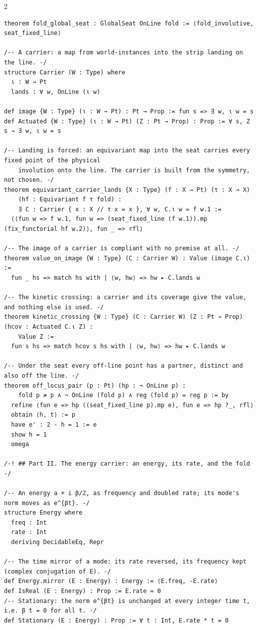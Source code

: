 \documentclass[10pt]{article}
\begin{document}
\begin{multicols}{2}
\begin{Verbatim}[fontsize=\fontsize{6.2}{7.2}\selectfont,breaklines,breakanywhere,breaksymbolleft={}]
theorem fold_global_seat : GlobalSeat OnLine fold := ⟨fold_involutive, seat_fixed_line⟩

/-- A carrier: a map from world-instances into the strip landing on the line. -/
structure Carrier (W : Type) where
  ι : W → Pt
  lands : ∀ w, OnLine (ι w)

def image {W : Type} (ι : W → Pt) : Pt → Prop := fun s => ∃ w, ι w = s
def Actuated {W : Type} (ι : W → Pt) (Z : Pt → Prop) : Prop := ∀ s, Z s → ∃ w, ι w = s

/-- Landing is forced: an equivariant map into the seat carries every fixed point of the physical
    involution onto the line. The carrier is built from the symmetry, not chosen. -/
theorem equivariant_carrier_lands {X : Type} (f : X → Pt) (τ : X → X)
    (hf : Equivariant f τ fold) :
    ∃ C : Carrier { x : X // τ x = x }, ∀ w, C.ι w = f w.1 :=
  ⟨⟨fun w => f w.1, fun w => (seat_fixed_line (f w.1)).mp (fix_functorial hf w.2)⟩, fun _ => rfl⟩

/-- The image of a carrier is compliant with no premise at all. -/
theorem value_on_image {W : Type} (C : Carrier W) : Value (image C.ι) :=
  fun _ hs => match hs with | ⟨w, hw⟩ => hw ▸ C.lands w

/-- The kinetic crossing: a carrier and its coverage give the value, and nothing else is used. -/
theorem kinetic_crossing {W : Type} (C : Carrier W) (Z : Pt → Prop) (hcov : Actuated C.ι Z) :
    Value Z :=
  fun s hs => match hcov s hs with | ⟨w, hw⟩ => hw ▸ C.lands w

/-- Under the seat every off-line point has a partner, distinct and also off the line. -/
theorem off_locus_pair (p : Pt) (hp : ¬ OnLine p) :
    fold p ≠ p ∧ ¬ OnLine (fold p) ∧ reg (fold p) = reg p := by
  refine ⟨fun e => hp ((seat_fixed_line p).mp e), fun e => hp ?_, rfl⟩
  obtain ⟨h, t⟩ := p
  have e' : 2 - h = 1 := e
  show h = 1
  omega

/-! ## Part II. The energy carrier: an energy, its rate, and the fold -/

/-- An energy a + i β/2, as frequency and doubled rate; its mode's norm moves as e^{βt}. -/
structure Energy where
  freq : Int
  rate : Int
  deriving DecidableEq, Repr

/-- The time mirror of a mode: its rate reversed, its frequency kept (complex conjugation of E). -/
def Energy.mirror (E : Energy) : Energy := ⟨E.freq, -E.rate⟩
def IsReal (E : Energy) : Prop := E.rate = 0
/-- Stationary: the norm e^{βt} is unchanged at every integer time t, i.e. β t = 0 for all t. -/
def Stationary (E : Energy) : Prop := ∀ t : Int, E.rate * t = 0


\end{Verbatim}
\end{multicols}
\end{document}
